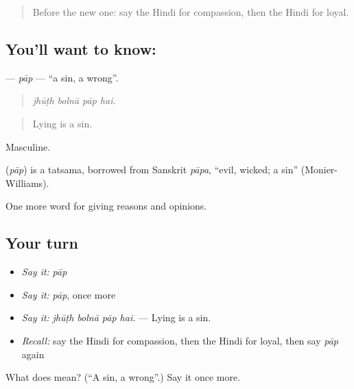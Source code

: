 \begin{quote}
Before the new one: say the Hindi for compassion, then the Hindi for loyal.
\end{quote}

\subsection*{You'll want to know: }
\textbf{} — \emph{pāp} — \textquotedblleft{}a sin, a wrong\textquotedblright{}.

\begin{quote}
   
\end{quote}

\begin{quote}
\emph{jhūṭh bolnā pāp hai.}
\end{quote}

\begin{quote}
Lying is a sin.
\end{quote}

Masculine.

\begin{cousinweb}
\textbf{} (\emph{pāp}) is a tatsama, borrowed from Sanskrit \emph{pāpa}, \textquotedblleft{}evil, wicked; a sin\textquotedblright{} (Monier-Williams).
\end{cousinweb}

\begin{grammarlens}[title={What you've built}]
One more word for giving reasons and opinions.
\end{grammarlens}

\subsection*{Your turn}
\begin{itemize}
\raggedright
  \item \emph{Say it:} \emph{pāp}
  \item \emph{Say it:} \emph{pāp}, once more
  \item \emph{Say it:} \emph{jhūṭh bolnā pāp hai.} — Lying is a sin.
  \item \emph{Recall:} say the Hindi for compassion, then the Hindi for loyal, then say \emph{pāp} again
\end{itemize}

\begin{tcolorbox}[breakable,colback=teal!4,colframe=teal!35!black,title={Before you move on}]
What does  mean? (\textquotedblleft{}A sin, a wrong\textquotedblright{}.) Say it once more.
\end{tcolorbox}
